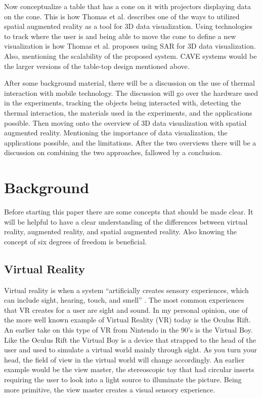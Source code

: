 \documentclass{sig-alternate}
\begin{document}
Now conceptualize a table that has a cone on it with projectors displaying data on the cone. This is how Thomas et al. describes one of the ways to utilized spatial augmented reality as a tool for 3D data visualization. Using technologies to track where the user is and being able to move the cone to define a new visualization is how Thomas et al. proposes using SAR for 3D data visualization. Also, mentioning the scalability of the proposed system. CAVE systems would be the larger versions of the table-top design mentioned above.      

After some background material, there will be a discussion on the use of thermal interaction with mobile technology. The discussion will go over the hardware used in the experiments, tracking the objects being interacted with, detecting the thermal interaction, the materials used in the experiments, and the applications possible. Then moving onto the overview of 3D data visualization with spatial augmented reality. Mentioning the importance of data visualization, the applications possible, and the limitations. After the two overviews there will be a discussion on combining the two approaches, fallowed by a conclusion.       


\section{Background}
\label{sec:background} 
Before starting this paper there are some concepts that should be made clear. It will be helpful to have a clear understanding of the differences between virtual reality, augmented reality, and spatial augmented reality. Also knowing the concept of six degrees of freedom is beneficial.  

\subsection{Virtual Reality}
\label{sec:Virtual Reality}
Virtual reality is when a system ``artificially creates sensory experiences, which can include sight, hearing, touch, and smell'' \cite{VR}. The most common experiences that VR creates for a user are sight and sound. In my personal opinion, one of the more well known example of Virtual Reality (VR) today is the Oculus Rift. An earlier take on this type of VR from Nintendo in the 90's is the Virtual Boy. Like the Oculus Rift the Virtual Boy is a device that strapped to the head of the user and used to simulate a virtual world mainly through sight. As you turn your head, the field of view in the virtual world will change accordingly. An earlier example would be the view master, the stereoscopic toy that had circular inserts requiring the user to look into a light source to illuminate the picture. Being more primitive, the view master creates a visual sensory experience.       
\end{document}
